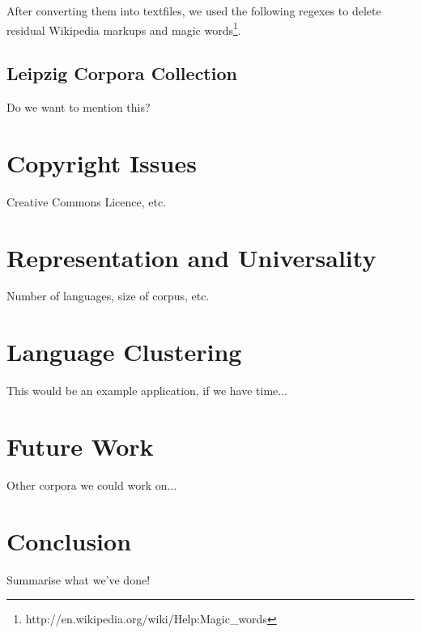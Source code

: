 \documentclass[11pt]{article}
\begin{document}
After converting them into textfiles, we used the following regexes to delete residual Wikipedia markups and magic words\footnote{http://en.wikipedia.org/wiki/Help:Magic\_words}.

\subsection{Leipzig Corpora Collection}

Do we want to mention this?


\section{Copyright Issues}

Creative Commons Licence, etc.


\section{Representation and Universality}

Number of languages, size of corpus, etc.


\section{Language Clustering}

This would be an example application, if we have time...


\section{Future Work}

Other corpora we could work on...


\section{Conclusion}

Summarise what we've done!



\end{document}
